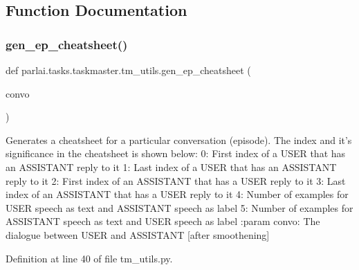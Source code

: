\subsection{Function Documentation}
\mbox{\label{namespaceparlai_1_1tasks_1_1taskmaster_1_1tm__utils_aad8e1c42802da1765887ff0407bed1b1}} 
\subsubsection{\texorpdfstring{gen\+\_\+ep\+\_\+cheatsheet()}{gen\_ep\_cheatsheet()}}
{\footnotesize\ttfamily def parlai.\+tasks.\+taskmaster.\+tm\+\_\+utils.\+gen\+\_\+ep\+\_\+cheatsheet (\begin{DoxyParamCaption}\item[{}]{convo }\end{DoxyParamCaption})}

\begin{DoxyVerb}Generates a cheatsheet for a particular conversation (episode).
The index and it's significance in the cheatsheet is shown below:
    0: First index of a USER that has an ASSISTANT reply to it
    1: Last index of a USER that has an ASSISTANT reply to it
    2: First index of an ASSISTANT that has a USER reply to it
    3: Last index of an ASSISTANT that has a USER reply to it
    4: Number of examples for USER speech  as text and ASSISTANT speech as label
    5: Number of examples for ASSISTANT speech as text and USER speech  as label
:param convo:
    The dialogue between USER and ASSISTANT [after smoothening]
\end{DoxyVerb}
 

Definition at line 40 of file tm\+\_\+utils.\+py.


